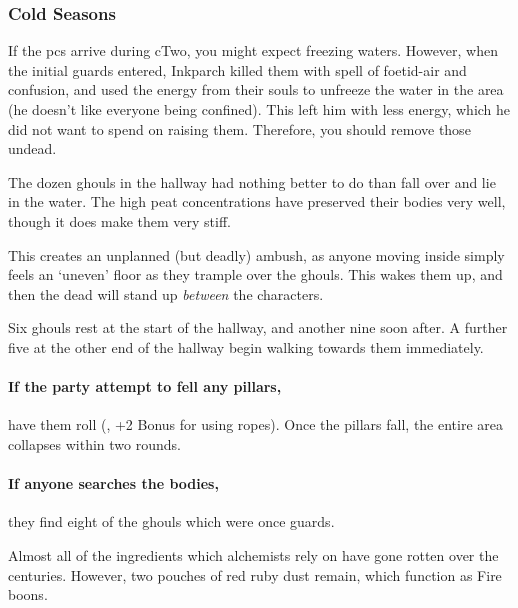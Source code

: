 \subsubsection*{Cold Seasons}

If the \glspl{pc} arrive during \gls{cTwo}, you might expect freezing waters.
However, when the initial \glspl{guard} entered, Inkparch killed them with \gls{spell} of foetid-air and confusion, and used the energy from their souls to unfreeze the water in the area (he doesn't like everyone being confined).
This left him with less energy, which he did not want to spend on raising them.
Therefore, you should remove those undead.


The dozen ghouls in the hallway had nothing better to do than fall over and lie in the water.
The high peat concentrations have preserved their bodies very well, though it does make them very stiff.

This creates an unplanned (but deadly) ambush, as anyone moving inside simply feels an `uneven' floor as they trample over the ghouls.
This wakes them up, and then the dead will stand up \emph{between} the characters.

Six ghouls rest at the start of the hallway, and another nine soon after.
A further five at the other end of the hallway begin walking towards them immediately.

\paragraph{If the party attempt to fell any pillars,}
have them roll  (\tn[13], +2 Bonus for using ropes).
Once the pillars fall, the entire area collapses within two rounds.

\paragraph{If anyone searches the bodies,}
they find eight of the ghouls which were once \glspl{guard}.

\bookInvestigationChart[b]




Almost all of the \glspl{ingredient} which alchemists rely on have gone rotten over the centuries.
However, two pouches of red ruby dust remain, which function as Fire \glspl{boon}.

